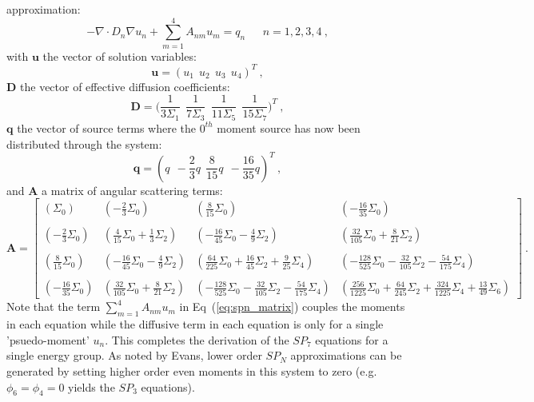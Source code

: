 \documentclass[letterpaper,12pt]{article}
\begin{document}
approximation:
\begin{equation}
  -\nabla \cdot D_n \nabla u_n + \sum_{m=1}^4 A_{nm} u_m =
  q_n\ \ \ \ \ \ \ n = 1,2,3,4\:,
  \label{eq:spn_matrix}
\end{equation}
with $\mathbf{u}$ the vector of solution variables:
\begin{equation}
  \mathbf{u} = ( u_1\ \ u_2\ \ u_3\ \ u_4 )^T \:,
  \label{eq:spn7_solution_vector}
\end{equation}
$\mathbf{D}$ the vector of effective diffusion coefficients:
\begin{equation}
  \mathbf{D} = \Bigg( \frac{1}{3\Sigma_1}\ \ \frac{1}{7\Sigma_3}\ \
  \frac{1}{11\Sigma_5}\ \ \frac{1}{15\Sigma_7} \Bigg)^T\:,
  \label{eq:spn7_diffusion_coeffs}
\end{equation}
$\mathbf{q}$ the vector of source terms where the $0^{th}$ moment
source has now been distributed through the system:
\begin{equation}
  \mathbf{q} = (
  q\ \ -\frac{2}{3}q\ \ \frac{8}{15}q\ \ -\frac{16}{35}q )^T\:,
  \label{eq:spn7_source_vector}
\end{equation}
and $\mathbf{A}$ a matrix of angular scattering terms:
\begin{equation}
  \mathbf{A} = 
  \begin{bmatrix}
    (\Sigma_0) &
    (-\frac{2}{3}\Sigma_0) &
    (\frac{8}{15}\Sigma_0) &
    (-\frac{16}{35}\Sigma_0) \\
    &&&\\
    (-\frac{2}{3}\Sigma_0) &
    (\frac{4}{15}\Sigma_0 + \frac{1}{3}\Sigma_2) &
    (-\frac{16}{45}\Sigma_0 - \frac{4}{9}\Sigma_2) &
    (\frac{32}{105}\Sigma_0 + \frac{8}{21}\Sigma_2) \\
    &&&\\
    (\frac{8}{15}\Sigma_0) &
    (-\frac{16}{45}\Sigma_0 - \frac{4}{9}\Sigma_2) &
    (\frac{64}{225}\Sigma_0 + \frac{16}{45}\Sigma_2 + \frac{9}{25}\Sigma_4) &
    (-\frac{128}{525}\Sigma_0 - \frac{32}{105}\Sigma_2 - \frac{54}{175}\Sigma_4)
    \\ 
    &&&\\
    (-\frac{16}{35}\Sigma_0) &
    (\frac{32}{105}\Sigma_0 + \frac{8}{21}\Sigma_2) &
    (-\frac{128}{525}\Sigma_0 - \frac{32}{105}\Sigma_2 - \frac{54}{175}\Sigma_4)
    & 
    (\frac{256}{1225}\Sigma_0 + \frac{64}{245}\Sigma_2 +
    \frac{324}{1225}\Sigma_4 + \frac{13}{49}\Sigma_6)
  \end{bmatrix}\:.
  \label{eq:A_matrix}
\end{equation}
Note that the term $\sum_{m=1}^4 A_{nm} u_m$ in
Eq~(\ref{eq:spn_matrix}) couples the moments in each equation while
the diffusive term in each equation is only for a single
'psuedo-moment' $u_n$. This completes the derivation of the $SP_7$
equations for a single energy group. As noted by Evans, lower order
$SP_N$ approximations can be generated by setting higher order even
moments in this system to zero (e.g. $\phi_6 = \phi_4 = 0$ yields the
$SP_3$ equations).
\end{document}
